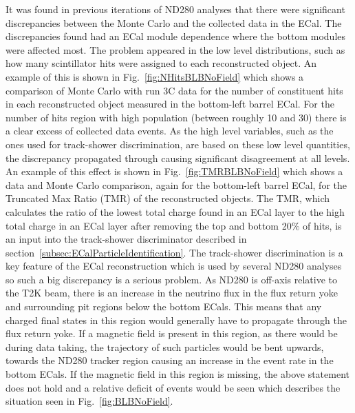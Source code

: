 It was found in previous iterations of ND280 analyses that there were significant discrepancies between the Monte Carlo and the collected data in the ECal.  The discrepancies found had an ECal module dependence where the bottom modules were affected most.  The problem appeared in the low level distributions, such as how many scintillator hits were assigned to each reconstructed object.  An example of this is shown in Fig.~\ref{fig:NHitsBLBNoField} which shows a comparison of Monte Carlo with run 3C data for the number of constituent hits in each reconstructed object measured in the bottom-left barrel ECal.  For the number of hits region with high population (between roughly 10 and 30) there is a clear excess of collected data events.  As the high level variables, such as the ones used for track-shower discrimination, are based on these low level quantities, the discrepancy propagated through causing significant disagreement at all levels.  An example of this effect is shown in Fig.~\ref{fig:TMRBLBNoField} which shows a data and Monte Carlo comparison, again for the bottom-left barrel ECal, for the Truncated Max Ratio (TMR) of the reconstructed objects.  The TMR, which calculates the ratio of the lowest total charge found in an ECal layer to the high total charge in an ECal layer after removing the top and bottom 20$\%$ of hits, is an input into the track-shower discriminator described in section~\ref{subsec:ECalParticleIdentification}.  The track-shower discrimination is a key feature of the ECal reconstruction which is used by several ND280 analyses so such a big discrepancy is a serious problem.
\newline
\newline
As ND280 is off-axis relative to the T2K beam, there is an increase in the neutrino flux in the flux return yoke and surrounding pit regions below the bottom ECals.  This means that any charged final states in this region would generally have to propagate through the flux return yoke.  If a magnetic field is present in this region, as there would be during data taking, the trajectory of such particles would be bent upwards, towards the ND280 tracker region causing an increase in the event rate in the bottom ECals.  If the magnetic field in this region is missing, the above statement does not hold and a relative deficit of events would be seen which describes the situation seen in Fig.~\ref{fig:BLBNoField}.
